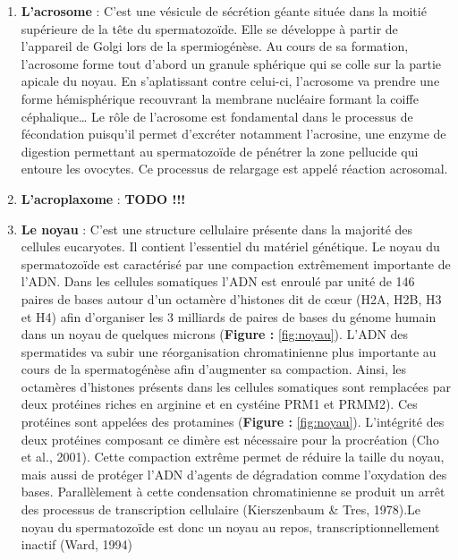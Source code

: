 \documentclass[12pt,twoside]{reedthesis}
\providecommand{\tightlist}{%
  \setlength{\itemsep}{0pt}\setlength{\parskip}{0pt}}
\theoremstyle{definition}
\theoremstyle{definition}
\theoremstyle{remark}
\begin{document}
  \begin{enumerate}
  \def\labelenumi{\arabic{enumi}.}
  \tightlist
  \item
    \textbf{L'acrosome} : C'est une vésicule de sécrétion géante située
    dans la moitié supérieure de la tête du spermatozoïde. Elle se
    développe à partir de l'appareil de Golgi lors de la spermiogénèse. Au
    cours de sa formation, l'acrosome forme tout d'abord un granule
    sphérique qui se colle sur la partie apicale du noyau. En
    s'aplatissant contre celui-ci, l'acrosome va prendre une forme
    hémisphérique recouvrant la membrane nucléaire formant la coiffe
    céphalique\ldots{} Le rôle de l'acrosome est fondamental dans le
    processus de fécondation puisqu'il permet d'excréter notamment
    l'acrosine, une enzyme de digestion permettant au spermatozoïde de
    pénétrer la zone pellucide qui entoure les ovocytes. Ce processus de
    relargage est appelé réaction acrosomal.\\
  \item
    \textbf{L'acroplaxome} : \textbf{TODO !!!}\\
  \item
    \textbf{Le noyau} : C'est une structure cellulaire présente dans la
    majorité des cellules eucaryotes. Il contient l'essentiel du matériel
    génétique. Le noyau du spermatozoïde est caractérisé par une
    compaction extrêmement importante de l'ADN. Dans les cellules
    somatiques l'ADN est enroulé par unité de 146 paires de bases autour
    d'un octamère d'histones dit de cœur (H2A, H2B, H3 et H4) afin
    d'organiser les 3 milliards de paires de bases du génome humain dans
    un noyau de quelques microns (\textbf{Figure : }\ref{fig:noyau}).
    L'ADN des spermatides va subir une réorganisation chromatinienne plus
    importante au cours de la spermatogénèse afin d'augmenter sa
    compaction. Ainsi, les octamères d'histones présents dans les cellules
    somatiques sont remplacées par deux protéines riches en arginine et en
    cystéine PRM1 et PRMM2). Ces protéines sont appelées des protamines
    (\textbf{Figure : }\ref{fig:noyau}). L'intégrité des deux protéines
    composant ce dimère est nécessaire pour la procréation (Cho et al.,
    2001). Cette compaction extrême permet de réduire la taille du noyau,
    mais aussi de protéger l'ADN d'agents de dégradation comme l'oxydation
    des bases. Parallèlement à cette condensation chromatinienne se
    produit un arrêt des processus de transcription cellulaire
    (Kierszenbaum \& Tres, 1978).Le noyau du spermatozoïde est donc un
    noyau au repos, transcriptionnellement inactif (Ward, 1994)
  \end{enumerate}
  
\end{document}
